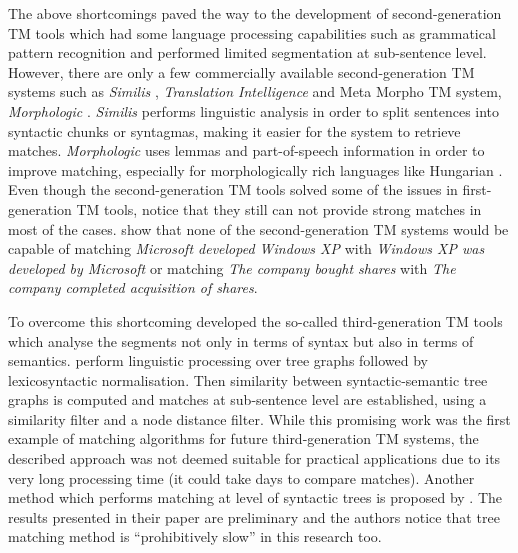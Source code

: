 The above shortcomings paved the way to the development of second-generation TM tools which had some language processing capabilities such as grammatical pattern recognition and performed limited segmentation at sub-sentence level. However, there are only a few commercially available second-generation TM systems such as \textit{Similis} \autocite{planas2005similis}, \textit{Translation Intelligence} \autocite{gronroos2005bringing} and Meta Morpho TM system, \textit{Morphologic} \autocite{hodasz2005metamorpho}. \textit{Similis} \autocite{planas2005similis} performs linguistic analysis in order to split sentences into syntactic chunks or syntagmas, making it easier for the system to retrieve matches. \textit{Morphologic} uses lemmas and part-of-speech information in order to improve matching, especially for morphologically rich languages like Hungarian \autocite{hodasz2005metamorpho}. Even though the second-generation TM tools solved some of the issues in first-generation TM tools, \autocite{mitkov2008improving} notice that they still can not provide strong matches in most of the cases. \autocite{mitkov2008improving} show that none of the second-generation TM systems would be capable of matching \textit{Microsoft developed Windows XP} with \textit{Windows XP was developed by Microsoft} or matching \textit{The company bought shares} with \textit{The company completed acquisition of shares}. 


To overcome this shortcoming \autocite{pekar2007new} developed the so-called third-generation TM tools which analyse the segments not only in terms of syntax but also in terms of semantics. \autocite{pekar2007new} perform linguistic processing over tree graphs \autocite{szpektor-etal-2004-scaling,10.1007/978-3-540-30586-6_1} followed by lexicosyntactic normalisation. Then similarity between syntactic-semantic tree graphs is computed and matches at sub-sentence level are established, using a similarity filter and a node distance filter. While this promising work was the first example of matching algorithms for future third-generation TM systems, the described approach was not deemed suitable for practical applications due to its very long processing time (it could take days to compare matches). Another method which performs matching at level of syntactic trees is proposed by \autocite{vanallemeersch2014improving}. The results presented in their paper are preliminary and the authors notice that tree matching method is ``prohibitively slow'' in this research too.

